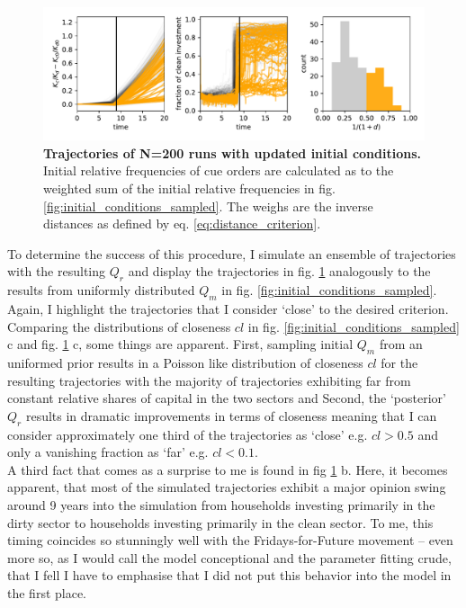 \begin{figure}[t]
  \centering
  \includegraphics[width= \textwidth]{figures/initial_condition_fitted.pdf}
  \caption{\textbf{Trajectories of N=200 runs with updated initial conditions.} Initial relative frequencies of cue orders are calculated as to the weighted sum of the initial relative frequencies in fig. \ref{fig:initial_conditions_sampled}. The weighs are the inverse distances as defined by eq. \ref{eq:distance_criterion}.}
  \label{fig:initial_conditions_fitted}
\end{figure}

To determine the success of this procedure, I simulate an ensemble of trajectories with the resulting $Q_r$ and display the trajectories in fig. \ref{fig:initial_conditions_fitted} analogously to the results from uniformly distributed $Q_m$ in fig. \ref{fig:initial_conditions_sampled}. Again, I highlight the trajectories that I consider `close' to the desired criterion. Comparing the distributions of closeness $cl$ in fig. \ref{fig:initial_conditions_sampled} c and fig. \ref{fig:initial_conditions_fitted} c, some things are apparent. First, sampling initial $Q_m$ from an uniformed prior results in a Poisson like distribution of closeness $cl$ for the resulting trajectories with the majority of trajectories exhibiting far from constant relative shares of capital in the two sectors and Second, the `posterior' $Q_r$ results in dramatic improvements in terms of closeness meaning that I can consider approximately one third of the trajectories as `close' e.g. $cl>0.5$ and only a vanishing fraction as `far' e.g. $cl<0.1$.\\

A third fact that comes as a surprise to me is found in fig \ref{fig:initial_conditions_fitted} b. Here, it becomes apparent, that most of the simulated trajectories exhibit a major opinion swing around 9 years into the simulation from households investing primarily in the dirty sector to households investing primarily in the clean sector. To me, this timing coincides so stunningly well with the Fridays-for-Future movement -- even more so, as I would call the model conceptional and the parameter fitting crude, that I fell I have to emphasise that I did not put this behavior into the model in the first place.

